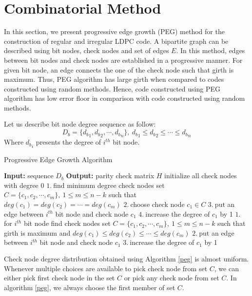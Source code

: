 \section{Combinatorial Method}
In this section, we present progressive edge growth (PEG) method for the construction of regular and irregular LDPC code. A bipartite graph can be described using bit nodes, check nodes and set of edges $E$. In this method, edges between bit nodes and check nodes are established in a progressive manner. For given bit node, an edge connects the one of the check node such that girth is maximum. Thus, PEG algorithm has large girth when compared to codes constructed using random methods. Hence, code constructed using PEG algorithm has low error floor in comparison with code constructed using random methods\cite{speg}.

Let us describe bit node degree sequence as follow:
\begin{equation*}
 D_b=\{{d_b}_1,{d_b}_2,\cdots,{d_b}_n\},~ {d_b}_1 \leq {d_b}_2 \leq \cdots \leq {d_b}_n
\end{equation*}
%
Where ${d_b}_i$ presents the degree of $i^{th}$ bit node.

\begin{algorithm}[H]
\caption{Progressive Edge Growth Algorithm\cite{PEG}}
\label{peg}
\begin{algorithmic}
\STATE \textbf{Input:} sequence $D_b$
\STATE \textbf{Output:} parity check matrix $H$
\STATE initialize all check nodes with degree $0$
\STATE $1.~$find minimum degree check nodes set $C=\{c_1,c_2,\cdots,c_m\},~ 1 \leq m\leq n-k$ such that $deg(c_1)=deg(c_2)=\cdots=deg(c_m)$
\STATE $2.~$choose check node $c_1 \in C$
\STATE $3.~$put an edge between $i^{th}$ bit node and check node $c_1$
\STATE $4.~$increase the degree of $c_1$ by 1
\ELSE
\STATE $1.~$for $i^{th}$ bit node find check nodes set $C=\{c_1,c_2,\cdots,c_m\},~1\leq m\leq n-k$ such that girth is maximum and $deg(c_1) \leq deg(c_2) \leq \cdots \leq deg(c_m)$
\STATE $2.~$put an edge between $i^{th}$ bit node and check node $c_1$ 
\STATE $3.~$increase the degree of $c_1$ by 1
\ENDIF
\ENDFOR
\ENDFOR
\end{algorithmic}
\end{algorithm}
%
Check node degree distribution obtained using Algorithm \ref{peg} is almost uniform. Whenever multiple choices are available to pick check node from set $C$, we can either pick first check node in the set $C$ or pick any check node from set $C$. In algorithm \ref{peg}, we always choose the first member of set $C$.

